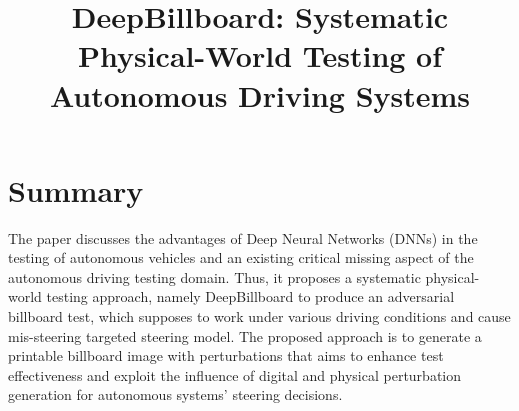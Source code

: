 \documentclass[10pt,a4paper]{report}
\title{DeepBillboard: Systematic Physical-World Testing of Autonomous Driving Systems}
\begin{document}
\begin{center}
\textbf{\thetitle}
\end{center}


\section{Summary}
The paper discusses the advantages of Deep Neural Networks (DNNs) in the testing of autonomous vehicles and an existing critical missing aspect of the autonomous driving testing domain. 
%
Thus, it proposes a systematic physical-world testing approach, namely DeepBillboard to produce an adversarial billboard test, which supposes to work under various driving conditions and cause mis-steering targeted steering model.
%
The proposed approach is to generate a printable billboard image with perturbations that aims to enhance test effectiveness and exploit the influence of digital and physical perturbation generation for autonomous systems' steering decisions.
\end{document}

